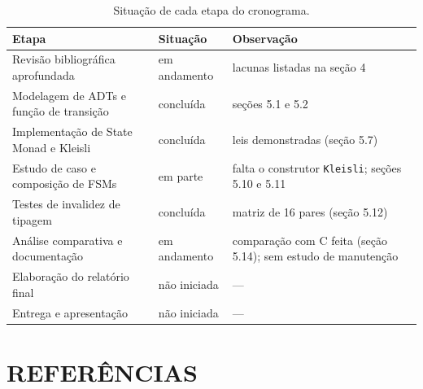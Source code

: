 \documentclass[12pt,a4paper]{article}
\begin{document}
\begin{table}[h]
\centering
\footnotesize
\begin{tabular}{|p{6.2cm}|p{2.6cm}|p{6.2cm}|}
\hline
Etapa & Situação & Observação \\
\hline
Revisão bibliográfica aprofundada & em andamento & lacunas listadas na seção 4 \\
\hline
Modelagem de ADTs e função de transição & concluída & seções 5.1 e 5.2 \\
\hline
Implementação de State Monad e Kleisli & concluída & leis demonstradas (seção 5.7) \\
\hline
Estudo de caso e composição de FSMs & em parte & falta o construtor \texttt{Kleisli}; seções 5.10 e 5.11 \\
\hline
Testes de invalidez de tipagem & concluída & matriz de 16 pares (seção 5.12) \\
\hline
Análise comparativa e documentação & em andamento & comparação com C feita (seção 5.14); sem estudo de manutenção \\
\hline
Elaboração do relatório final & não iniciada & --- \\
\hline
Entrega e apresentação & não iniciada & --- \\
\hline
\end{tabular}
\caption{Situação de cada etapa do cronograma.}
\end{table}


\newpage
\section{REFERÊNCIAS}
\end{document}
